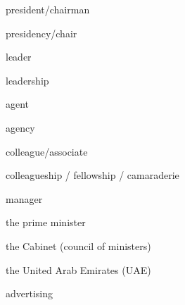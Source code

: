 \begin{flashcard}{\LARGE president/chairman}
\LARGE {}
\end{flashcard}
\begin{flashcard}{\LARGE presidency/chair}
\LARGE {}
\end{flashcard}
\begin{flashcard}{\LARGE leader}
\LARGE {}
\end{flashcard}
\begin{flashcard}{\LARGE leadership}
\LARGE {}
\end{flashcard}
\begin{flashcard}{\LARGE agent}
\LARGE {}
\end{flashcard}
\begin{flashcard}{\LARGE agency}
\LARGE {}
\end{flashcard}
\begin{flashcard}{\LARGE colleague/associate}
\LARGE {}
\end{flashcard}
\begin{flashcard}{\LARGE colleagueship / fellowship / camaraderie}
\LARGE {}
\end{flashcard}
\begin{flashcard}{\LARGE manager}
\LARGE {}
\end{flashcard}
\begin{flashcard}{\LARGE the prime minister}
\LARGE {}
\end{flashcard}
\begin{flashcard}{\LARGE the Cabinet (council of ministers)}
\LARGE {}
\end{flashcard}
\begin{flashcard}{\LARGE the United Arab Emirates (UAE)}
\LARGE {}
\end{flashcard}
\begin{flashcard}{\LARGE advertising}
\LARGE {}
\end{flashcard}
